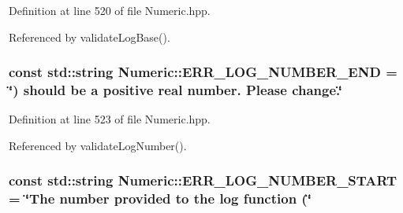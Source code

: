 \-Definition at line 520 of file \-Numeric.\-hpp.



\-Referenced by validate\-Log\-Base().

\hypertarget{classmultiscale_1_1Numeric_a2f61b82d42049e175a8d34cd75966c6c}{
\subsubsection[{\-E\-R\-R\-\_\-\-L\-O\-G\-\_\-\-N\-U\-M\-B\-E\-R\-\_\-\-E\-N\-D}]{\setlength{\rightskip}{0pt plus 5cm}const std\-::string {\bf \-Numeric\-::\-E\-R\-R\-\_\-\-L\-O\-G\-\_\-\-N\-U\-M\-B\-E\-R\-\_\-\-E\-N\-D} = \char`\"{}) should be a positive real number. \-Please change.\char`\"{}}}\label{classmultiscale_1_1Numeric_a2f61b82d42049e175a8d34cd75966c6c}


\-Definition at line 523 of file \-Numeric.\-hpp.



\-Referenced by validate\-Log\-Number().

\hypertarget{classmultiscale_1_1Numeric_a88ca9309ade745700dacbdc7c0d713f2}{
\subsubsection[{\-E\-R\-R\-\_\-\-L\-O\-G\-\_\-\-N\-U\-M\-B\-E\-R\-\_\-\-S\-T\-A\-R\-T}]{\setlength{\rightskip}{0pt plus 5cm}const std\-::string {\bf \-Numeric\-::\-E\-R\-R\-\_\-\-L\-O\-G\-\_\-\-N\-U\-M\-B\-E\-R\-\_\-\-S\-T\-A\-R\-T} = \char`\"{}\-The number provided to the {\bf log} function (\char`\"{}}}\label{classmultiscale_1_1Numeric_a88ca9309ade745700dacbdc7c0d713f2}


